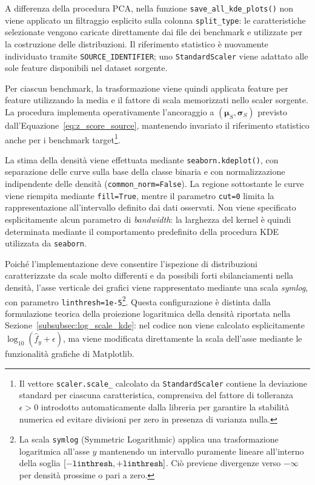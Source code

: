 A differenza della procedura PCA, nella funzione \texttt{save\_all\_kde\_plots()} non viene applicato un filtraggio esplicito sulla colonna \texttt{split\_type}: le caratteristiche selezionate vengono caricate direttamente dai file dei benchmark e utilizzate per la costruzione delle distribuzioni. 
Il riferimento statistico è nuovamente individuato tramite \texttt{SOURCE\_IDENTIFIER}; uno \texttt{StandardScaler} viene adattato alle sole feature disponibili nel dataset sorgente.

Per ciascun benchmark, la trasformazione viene quindi applicata feature per feature utilizzando la media e il fattore di scala memorizzati nello scaler sorgente. 
La procedura implementa operativamente l'ancoraggio a $(\boldsymbol{\mu}_S,\boldsymbol{\sigma}_S)$ previsto dall'Equazione~\eqref{eq:z_score_source}, mantenendo invariato il riferimento statistico anche per i benchmark target\footnote{Il vettore \texttt{scaler.scale\_} calcolato da \texttt{StandardScaler} contiene la deviazione standard per ciascuna caratteristica, comprensiva del fattore di tolleranza $\epsilon > 0$ introdotto automaticamente dalla libreria per garantire la stabilità numerica ed evitare divisioni per zero in presenza di varianza nulla.}.

La stima della densità viene effettuata mediante \texttt{seaborn.kdeplot()}, con separazione delle curve sulla base della classe binaria e con normalizzazione indipendente delle densità \newline (\texttt{common\_norm=False}). 
La regione sottostante le curve viene riempita mediante \texttt{fill=True}, mentre il parametro \texttt{cut=0} limita la rappresentazione all'intervallo definito dai dati osservati. Non viene specificato esplicitamente alcun parametro di \textit{bandwidth}: la larghezza del kernel è quindi determinata mediante il comportamento predefinito della procedura KDE utilizzata da \texttt{seaborn}.

Poiché l'implementazione deve consentire l'ispezione di distribuzioni caratterizzate da scale molto differenti e da possibili forti sbilanciamenti nella densità, l'asse verticale dei grafici viene rappresentato mediante una scala \textit{symlog}, con parametro \texttt{linthresh=1e-5}\footnote{La scala \texttt{symlog} (Symmetric Logarithmic) applica una trasformazione logaritmica all'asse $y$ mantenendo un intervallo puramente lineare all'interno della soglia $[-\text{\texttt{linthresh}}, +\text{\texttt{linthresh}}]$. Ciò previene divergenze verso $-\infty$ per densità prossime o pari a zero.}. 
Questa configurazione è distinta dalla formulazione teorica della proiezione logaritmica della densità riportata nella Sezione~\ref{subsubsec:log_scale_kde}: nel codice non viene calcolato esplicitamente $\log_{10}(\hat f_y+\epsilon)$, ma viene modificata direttamente la scala dell'asse mediante le funzionalità grafiche di Matplotlib.

